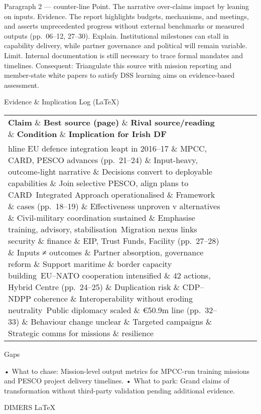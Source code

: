 Paragraph 2 — counter-line
Point. The narrative over-claims impact by leaning on inputs.
Evidence. The report highlights budgets, mechanisms, and meetings, and asserts unprecedented progress without external benchmarks or measured outputs (pp.\ 06–12, 27–30).
Explain. Institutional milestones can stall in capability delivery, while partner governance and political will remain variable.
Limit. Internal documentation is still necessary to trace formal mandates and timelines.
Consequent: Triangulate this source with mission reporting and member-state white papers to satisfy DSS learning aims on evidence-based assessment.

Evidence \& Implication Log (LaTeX)

\begin{tabular}{p{3.2cm}p{4.2cm}p{3.6cm}p{3.2cm}p{4.2cm}}
	\textbf{Claim} \& \textbf{Best source (page)} \& \textbf{Rival source/reading} \& \textbf{Condition} \& \textbf{Implication for Irish DF}\\hline
	EU defence integration leapt in 2016–17 \& MPCC, CARD, PESCO advances (pp.\ 21–24) \& Input-heavy, outcome-light narrative \& Decisions convert to deployable capabilities \& Join selective PESCO, align plans to CARD\
	Integrated Approach operationalised \& Framework \& cases (pp.\ 18–19) \& Effectiveness unproven v alternatives \& Civil-military coordination sustained \& Emphasise training, advisory, stabilisation\
	Migration nexus links security \& finance \& EIP, Trust Funds, Facility (pp.\ 27–28) \& Inputs ≠ outcomes \& Partner absorption, governance reform \& Support maritime \& border capacity building\
	EU–NATO cooperation intensified \& 42 actions, Hybrid Centre (pp.\ 24–25) \& Duplication risk \& CDP–NDPP coherence \& Interoperability without eroding neutrality\
	Public diplomacy scaled \& €50.9m line (pp.\ 32–33) \& Behaviour change unclear \& Targeted campaigns \& Strategic comms for missions \& resilience\
\end{tabular}

Gaps

• What to chase: Mission-level output metrics for MPCC-run training missions and PESCO project delivery timelines.
• What to park: Grand claims of transformation without third-party validation pending additional evidence.

\parencite{GRAY_2005}

DIMERS LaTeX


